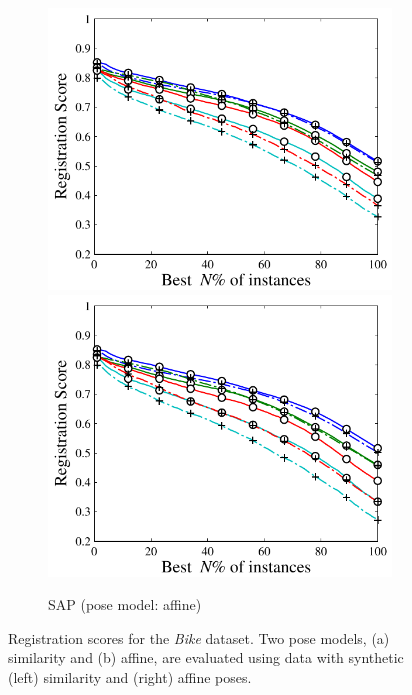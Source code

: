 \begin{figure}[ht]
\begin{subfigure}[b]{0.23\linewidth}
	\includegraphics[width=\linewidth]{fig/3dreg/reg2d_affsim.pdf}
	\includegraphics[width=\linewidth]{fig/3dreg/reg2d_affaff.pdf}
	\caption{SAP (pose model: affine)}
\end{subfigure}
\caption{Registration scores for the \emph{Bike} dataset. Two pose models, (a) similarity and (b) affine, are evaluated using data with synthetic (left) similarity and (right) affine poses.}
\label{fig:regresult2d}
\end{figure}

